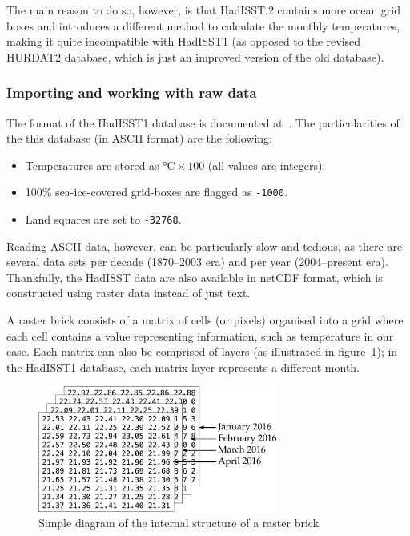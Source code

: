 The main reason to do so, however, is that HadISST.2 contains more ocean grid boxes and introduces a different method to calculate the monthly temperatures, making it quite incompatible with HadISST1 (as opposed to the revised HURDAT2 database, which is just an improved version of the old database).

\subsubsection{Importing and working with raw data}\label{ssec:hadisst-import}
The format of the HadISST1 database is documented at~\cite{o:hadisst1-format}. The particularities of the this database (in ASCII format) are the following:
\begin{itemize}
	\item Temperatures are stored as $\si{\celsius} \times 100$ (all values are integers).
	\item 100\% sea-ice-covered grid-boxes are flagged as \texttt{-1000}.
	\item Land squares are set to \texttt{-32768}.
\end{itemize}

Reading ASCII data, however, can be particularly slow and tedious, as there are several data sets per decade (1870--2003 era) and per year (2004--present era). Thankfully, the HadISST data are also available in netCDF format, which is constructed using raster data instead of just text.

A raster brick consists of a matrix of cells (or pixels) organised into a grid where each cell contains a value representing information, such as temperature in our case. Each matrix can also be comprised of layers (as illustrated in figure~\ref{fig:raster}); in the HadISST1 database, each matrix layer represents a different month.
\begin{figure}[H]
	\centering
	\includegraphics[width=0.7\textwidth]{images/raster}
	\caption{Simple diagram of the internal structure of a raster brick}
	\label{fig:raster}
\end{figure}

